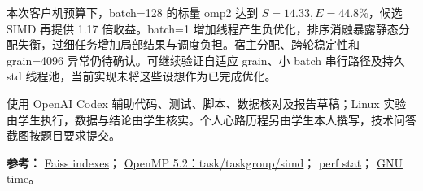 本次客户机预算下，batch=128 的标量 omp2 达到 $S=14.33,E=44.8\%$，候选 SIMD 再提供 1.17 倍收益。batch=1 增加线程产生负优化，排序消融暴露静态分配失衡，过细任务增加局部结果与调度负担。宿主分配、跨轮稳定性和 grain=4096 异常仍待确认。可继续验证自适应 grain、小 batch 串行路径及持久 std 线程池，当前实现未将这些设想作为已完成优化。

使用 OpenAI Codex 辅助代码、测试、脚本、数据核对及报告草稿；Linux 实验由学生执行，数据与结论由学生核实。个人心路历程另由学生本人撰写，技术问答截图按题目要求提交。

\noindent\footnotesize
\textbf{参考：}
\href{https://github.com/facebookresearch/faiss/wiki/Faiss-indexes}{Faiss indexes}；
\href{https://www.openmp.org/spec-html/5.2/openmp.html}{OpenMP 5.2：task/taskgroup/simd}；
\href{https://man7.org/linux/man-pages/man1/perf-stat.1.html}{perf stat}；
\href{https://www.gnu.org/software/time/}{GNU time}。

